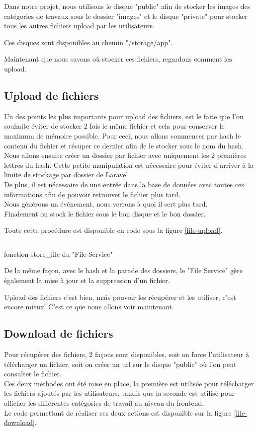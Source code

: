 \documentclass[
    iai, %
    il, %
]{heig-tb}
\begin{document}
Dans notre projet, nous utilisons le disque "public" afin de stocker les images des catégories de travaux sous le dossier "images" et le disque "private" pour stocker tous les autres fichiers upload par les utilisateurs.

Ces disques sont disponibles au chemin "/storage/app".

Maintenant que nous savons où stocker ces fichiers, regardons comment les upload.

\subsection{Upload de fichiers}
Un des points les plus importants pour upload des fichiers, est le faite que l'on souhaite éviter de stocker 2 fois le même fichier et cela pour conserver le maximum de mémoire possible. Pour ceci, nous allons commencer par \Gls{hash} le contenu du fichier et récuper ce dernier afin de le stocker sous le nom du \Gls{hash}. \\
Nous allons ensuite créer un dossier par fichier avec uniquement les 2 premières lettres du hash. Cette petite manipulation est nécessaire pour éviter d'arriver à la limite de stockage par dossier de Laravel. \\
De plus, il est nécessaire de une entrée dans la base de données avec toutes ces informations afin de pouvoir retrouver le fichier plus tard. \\
Nous générons un événement, nous verrons à quoi il sert plus tard. \\
Finalement on stock le fichier sous le bon disque et le bon dossier.

Toute cette procédure est disponible en code sous la figure \ref{file-upload}.

\begin{listing}[h]
    \inputminted{php}{assets/code/FileUpload.php}
    \caption{fonction store_file du "File Service" \label{file-upload}}
\end{listing}

De la même façon, avec le hash et la parade des dossiers, le "File Service" gère également la mise à jour et la suppression d'un fichier.

Upload des fichiers c'est bien, mais pouvoir les récupérer et les utiliser, c'est encore mieux!
C'est ce que nous allons voir maintenant.

\subsection{Download de fichiers}
Pour récupérer des fichiers, 2 façons sont disponibles, soit on force l'utilisateur à télécharger un fichier, soit on créer un \Gls{url} sur le disque "public" où l'on peut consulter le fichier. \\
Ces deux méthodes ont été mise en place, la première est utilisée pour télécharger les fichiers ajoutés par les utilisateurs, tandis que la seconde est utilisé pour afficher les différentes catégories de travail au niveau du \Gls{frontend}. \\
Le code permettant de réaliser ces deux actions est disponible sur la figure \ref{file-download}.
\end{document}
